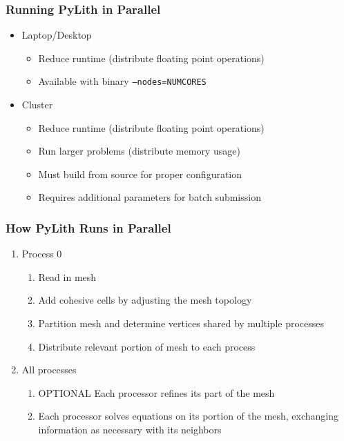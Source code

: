 \documentclass{beamer}
\begin{document}
\begin{frame}
  \frametitle{Running PyLith in Parallel}
  \summary{}

  \begin{itemize}
  \item Laptop/Desktop
    \begin{itemize}
    \item Reduce runtime (distribute floating point operations)
    \item Available with binary {\tt --nodes=NUMCORES}
    \end{itemize}
  \item Cluster
    \begin{itemize}
    \item Reduce runtime (distribute floating point operations)
    \item Run larger problems (distribute memory usage)
    \item Must build from source for proper configuration
    \item Requires additional parameters for batch submission
    \end{itemize}
  \end{itemize}

\end{frame}


\begin{frame}
  \frametitle{How PyLith Runs in Parallel}

  \begin{enumerate}
  \item Process 0
    \begin{enumerate}
    \item Read in mesh
    \item Add cohesive cells by adjusting the mesh topology
    \item Partition mesh and determine vertices shared by multiple
      processes
    \item Distribute relevant portion of mesh to each process
    \end{enumerate}
  \item All processes
    \begin{enumerate}
    \item OPTIONAL Each processor refines its part of the mesh
    \item Each processor solves equations on its portion of the mesh,
      exchanging information as necessary with its neighbors
    \end{enumerate}
  \end{enumerate}

\end{frame}
\end{document}
